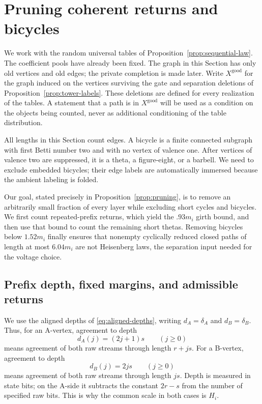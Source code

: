 \section{Pruning coherent returns and bicycles}
\label{sec:pruning}

We work with the random universal tables of
Proposition~\ref{prop:sequential-law}.  The coefficient pools have already
been fixed.  The graph in this Section has only old vertices and old edges;
the private completion is made later.  Write $X^{\mathrm{good}}$ for the
graph induced on the vertices surviving the gate and separation deletions
of Proposition~\ref{prop:tower-labels}.  These deletions are defined for
every realization of the tables.  A statement that a path is in
$X^{\mathrm{good}}$ will be used as a condition on the objects being
counted, never as additional conditioning of the table distribution.

All lengths in this Section count edges.  A bicycle is a finite connected
subgraph with first Betti number two and with no vertex of valence one.
After vertices of valence two are suppressed, it is a theta, a
figure-eight, or a barbell.  We need to exclude embedded bicycles; their
edge labels are automatically immersed because the ambient labeling is
folded.

Our goal, stated precisely in Proposition~\ref{prop:pruning}, is to remove
an arbitrarily small fraction of every layer while excluding short cycles
and bicycles. We first count repeated-prefix returns, which yield the
$.93m_i$ girth bound, and then use that bound to count the remaining short
thetas. Removing bicycles below $1.52m_i$ finally ensures that nonempty cyclically
reduced closed paths of length at most $6.04m_i$ are not Heisenberg laws,
the separation input needed for
the voltage choice.

\subsection{Prefix depth, fixed margins, and admissible returns}

We use the aligned depths of \eqref{eq:aligned-depths}, writing
$d_A=\delta_A$ and $d_B=\delta_B$.  Thus, for an A-vertex, agreement to depth
\[
  d_A(j)=(2j+1)s \qquad (j\geq0)
\]
means agreement of both raw streams through length $r+js$.  For a
B-vertex, agreement to depth
\[
  d_B(j)=2js \qquad (j\geq0)
\]
means agreement of both raw streams through length $js$.
Depth is measured in state bits; on the A-side it subtracts the constant
$2r-s$ from the number of specified raw bits.  This is why the common
scale in both cases is $H_i$.

